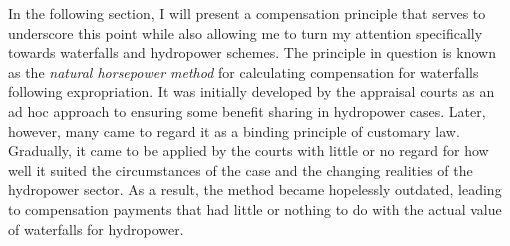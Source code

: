 In the following section, I will present a compensation principle that serves to underscore this point while also allowing me to turn my attention specifically towards waterfalls and hydropower schemes. The principle in question is known as the {\it natural horsepower method} for calculating compensation for waterfalls following expropriation. It was initially developed by the appraisal courts as an ad hoc approach to ensuring some benefit sharing in hydropower cases. Later, however, many came to regard it as a binding principle of customary law. Gradually, it came to be applied by the courts with little or no regard for how well it suited the circumstances of the case and the changing realities of the hydropower sector. As a result, the method became hopelessly outdated, leading to compensation payments that had little or nothing to do with the actual value of waterfalls for hydropower. 

%
%
%

